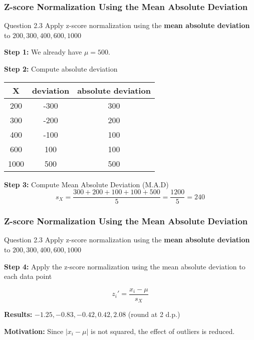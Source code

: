 \documentclass[aspectratio=169, 10pt]{beamer}
\begin{document}

\begin{frame}[t]
    \frametitle{Z-score Normalization Using the Mean Absolute Deviation}
    \small

    \begin{block}{Question 2.3}
        Apply z-score normalization using the \textbf{mean absolute deviation} to $200, 300, 400, 600, 1000$
    \end{block}

    \textbf{Step 1:} We already have $\mu=500$.

    \textbf{Step 2:} Compute absolute deviation
    \begin{table}[]
        \begin{tabular}{ccc}
              X & deviation  & absolute deviation \\
              \hline
              200  & -300 & 300\\
              300  & -200 & 200\\
              400  & -100 & 100\\
              600  & 100  & 100\\
              1000 & 500  & 500
        \end{tabular}
    \end{table}
    \textbf{Step 3:} Compute Mean Absolute Deviation (M.A.D)
    \[s_X  = \frac{300+200+100+100+500}{5}=\frac{1200}{5}=240 \]
    
\end{frame}


\begin{frame}[t]
    \frametitle{Z-score Normalization Using the Mean Absolute Deviation}
    \small

    \begin{block}{Question 2.3}
        Apply z-score normalization using the \textbf{mean absolute deviation} to $200, 300, 400, 600, 1000$
    \end{block}

    \textbf{Step 4:} Apply the z-score normalization using the mean absolute deviation to each data point
    
    \[z_i' = \frac{x_i - \mu}{s_X}\]
    
    \textbf{Results:} $-1.25, -0.83, -0.42,  0.42,  2.08$ (round at 2 d.p.)\\

    \vspace{1em}

    \textbf{Motivation:} Since $|x_i - \mu|$ is not squared, the effect of outliers is reduced.
\end{frame}
\end{document}
